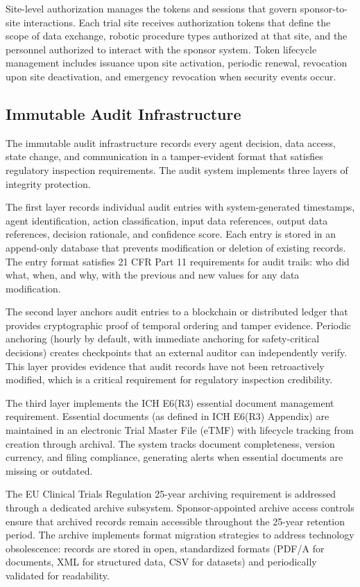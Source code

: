 Site-level authorization manages the tokens and sessions that govern sponsor-to-site
interactions. Each trial site receives authorization tokens that define the scope of
data exchange, robotic procedure types authorized at that site, and the personnel
authorized to interact with the sponsor system. Token lifecycle management includes
issuance upon site activation, periodic renewal, revocation upon site deactivation, and
emergency revocation when security events occur.

\subsection{Immutable Audit Infrastructure}

The immutable audit infrastructure records every agent decision, data access, state change,
and communication in a tamper-evident format that satisfies regulatory inspection
requirements. The audit system implements three layers of integrity protection.

The first layer records individual audit entries with system-generated timestamps, agent
identification, action classification, input data references, output data references,
decision rationale, and confidence score. Each entry is stored in an append-only database
that prevents modification or deletion of existing records. The entry format satisfies
21 CFR Part 11 \cite{cfr-part-11} requirements for audit trails: who did what, when, and
why, with the previous and new values for any data modification.

The second layer anchors audit entries to a blockchain or distributed ledger that provides
cryptographic proof of temporal ordering and tamper evidence. Periodic anchoring (hourly
by default, with immediate anchoring for safety-critical decisions) creates checkpoints
that an external auditor can independently verify. This layer provides evidence that
audit records have not been retroactively modified, which is a critical requirement for
regulatory inspection credibility.

The third layer implements the ICH E6(R3) essential document management requirement.
Essential documents (as defined in ICH E6(R3) Appendix) are maintained in an electronic
Trial Master File (eTMF) with lifecycle tracking from creation through archival. The
system tracks document completeness, version currency, and filing compliance, generating
alerts when essential documents are missing or outdated.

The EU Clinical Trials Regulation 25-year archiving requirement \cite{eu-ctr} is
addressed through a dedicated archive subsystem. Sponsor-appointed archive access controls
ensure that archived records remain accessible throughout the 25-year retention period.
The archive implements format migration strategies to address technology obsolescence:
records are stored in open, standardized formats (PDF/A for documents, XML for structured
data, CSV for datasets) and periodically validated for readability.

